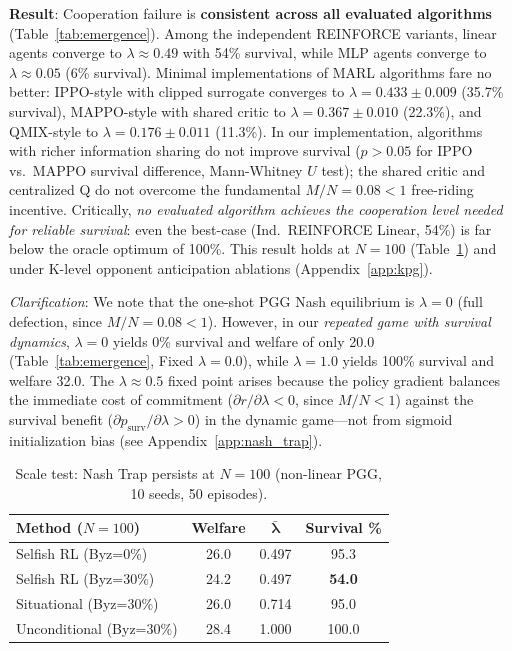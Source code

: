 \documentclass{article}
\begin{document}
\textbf{Result}: Cooperation failure is \textbf{consistent across all evaluated algorithms} (Table~\ref{tab:emergence}).
Among the independent REINFORCE variants, linear agents converge to $\lambda \approx 0.49$ with 54\% survival, while MLP agents converge to $\lambda \approx 0.05$ (6\% survival).
Minimal implementations of MARL algorithms fare no better: IPPO-style with clipped surrogate converges to $\lambda = 0.433 \pm 0.009$ (35.7\% survival), MAPPO-style with shared critic to $\lambda = 0.367 \pm 0.010$ (22.3\%), and QMIX-style to $\lambda = 0.176 \pm 0.011$ (11.3\%).
In our implementation, algorithms with richer information sharing do not improve survival ($p > 0.05$ for IPPO vs.\ MAPPO survival difference, Mann-Whitney $U$ test); the shared critic and centralized Q do not overcome the fundamental $M/N = 0.08 < 1$ free-riding incentive.
Critically, \emph{no evaluated algorithm achieves the cooperation level needed for reliable survival}: even the best-case (Ind.\ REINFORCE Linear, 54\%) is far below the oracle optimum of 100\%.
This result holds at $N=100$ (Table~\ref{tab:scale}) and under K-level opponent anticipation ablations (Appendix~\ref{app:kpg}).

\noindent\textit{Clarification}: We note that the one-shot PGG Nash equilibrium is $\lambda=0$ (full defection, since $M/N = 0.08 < 1$).
However, in our \emph{repeated game with survival dynamics}, $\lambda=0$ yields 0\% survival and welfare of only 20.0 (Table~\ref{tab:emergence}, Fixed $\lambda=0.0$), while $\lambda=1.0$ yields 100\% survival and welfare 32.0.
The $\lambda \approx 0.5$ fixed point arises because the policy gradient balances the immediate cost of commitment ($\partial r/\partial \lambda < 0$, since $M/N < 1$) against the survival benefit ($\partial p_{\text{surv}}/\partial \lambda > 0$) in the dynamic game---not from sigmoid initialization bias (see Appendix~\ref{app:nash_trap}).

\begin{table}[t]
\centering
\caption{Scale test: Nash Trap persists at $N{=}100$ (non-linear PGG, 10 seeds, 50 episodes).}
\label{tab:scale}
\begin{tabular}{lccc}
\toprule
\textbf{Method ($N{=}100$)} & \textbf{Welfare} & $\boldsymbol{\bar{\lambda}}$ & \textbf{Survival \%} \\
\midrule
Selfish RL (Byz=0\%) & 26.0 & 0.497 & 95.3 \\
Selfish RL (Byz=30\%) & 24.2 & 0.497 & \textbf{54.0} \\
\midrule
Situational (Byz=30\%) & 26.0 & 0.714 & 95.0 \\
Unconditional (Byz=30\%) & 28.4 & 1.000 & 100.0 \\
\bottomrule
\end{tabular}
\end{table}
\end{document}
